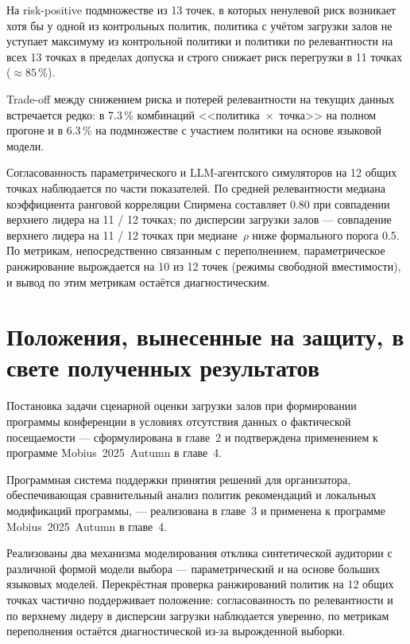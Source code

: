 На risk-positive подмножестве из 13 точек, в которых ненулевой риск возникает хотя бы у одной из контрольных политик, политика с учётом загрузки залов не уступает максимуму из контрольной политики и политики по релевантности на всех 13 точках в пределах допуска и строго снижает риск перегрузки в 11 точках ($\approx 85$\,\%).

Trade-off между снижением риска и потерей релевантности на текущих данных встречается редко: в 7.3\,\% комбинаций <<политика~$\times$~точка>> на полном прогоне и в 6.3\,\% на подмножестве с участием политики на основе языковой модели.

Согласованность параметрического и LLM-агентского симуляторов на 12 общих точках наблюдается по части показателей. По средней релевантности медиана коэффициента ранговой корреляции Спирмена составляет 0.80 при совпадении верхнего лидера на 11 / 12 точках; по дисперсии загрузки залов --- совпадение верхнего лидера на 11 / 12 точках при медиане~$\rho$ ниже формального порога 0.5. По метрикам, непосредственно связанным с переполнением, параметрическое ранжирование вырождается на 10 из 12 точек (режимы свободной вместимости), и вывод по этим метрикам остаётся диагностическим.


\section*{Положения, вынесенные на защиту, в свете полученных результатов}

Постановка задачи сценарной оценки загрузки залов при формировании программы конференции в условиях отсутствия данных о фактической посещаемости --- сформулирована в главе~2 и подтверждена применением к программе Mobius~2025~Autumn в главе~4.

Программная система поддержки принятия решений для организатора, обеспечивающая сравнительный анализ политик рекомендаций и локальных модификаций программы, --- реализована в главе~3 и применена к программе Mobius~2025~Autumn в главе~4.

Реализованы два механизма моделирования отклика синтетической аудитории с различной формой модели выбора --- параметрический и на основе больших языковых моделей. Перекрёстная проверка ранжирований политик на 12 общих точках частично поддерживает положение: согласованность по релевантности и по верхнему лидеру в дисперсии загрузки наблюдается уверенно, по метрикам переполнения остаётся диагностической из-за вырожденной выборки.

